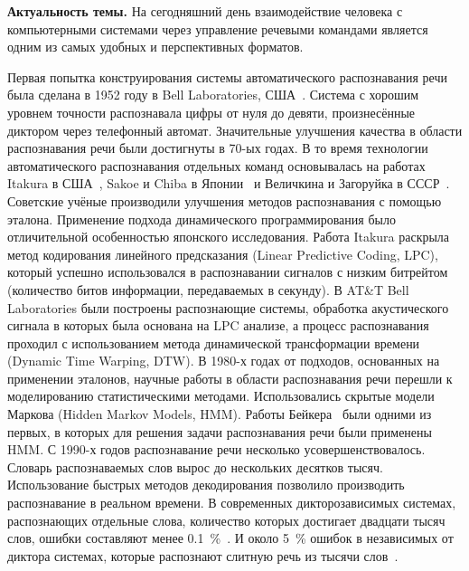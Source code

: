 \textbf{Актуальность темы.}
На сегодняшний день взаимодействие человека с компьютерными системами через управление речевыми командами является одним из самых удобных и перспективных форматов.


Первая попытка конструирования системы автоматического распознавания речи была сделана в 1952 году в Bell Laboratories, США~\cite{davis1952automatic}.
Система с хорошим уровнем точности распознавала цифры от нуля до девяти, произнесённые диктором через телефонный автомат.
Значительные улучшения качества в области распознавания речи были достигнуты в 70-ых годах.
В то время технологии автоматического распознавания отдельных команд основывалась на работах Itakura в США~\cite{itakura1975minimum}, Sakoe и Chiba в Японии~\cite{sakoe1978dynamic} и Величкина и Загоруйка в СССР~\cite{velichko1970automatic}.
Советские учёные производили улучшения методов распознавания с помощью эталона.
Применение подхода динамического программирования было отличительной особенностью японского исследования.
Работа Itakura раскрыла метод кодирования линейного предсказания (Linear Predictive Coding, LPC), который успешно использовался в распознавании сигналов с низким битрейтом (количество битов информации, передаваемых в секунду).
В AT\&T Bell Laboratories были построены распознающие системы, обработка акустического сигнала в которых была основана на LPC анализе, а процесс распознавания проходил с использованием метода динамической трансформации времени (Dynamic Time Warping, DTW).
В 1980-х годах от подходов, основанных на применении эталонов, научные работы в области распознавания речи перешли к моделированию статистическими методами.
Использовались скрытые модели Маркова (Hidden Markov Models, HMM).
Работы Бейкера~\cite{baker1990stochastic} были одними из первых, в которых для решения задачи распознавания речи были применены HMM.
С 1990-х годов распознавание речи несколько усовершенствовалось.
Словарь распознаваемых слов вырос до нескольких десятков тысяч.
Использование быстрых методов декодирования позволило производить распознавание в реальном времени.
В современных дикторозависимых системах, распознающих отдельные слова, количество которых достигает двадцати тысяч слов, ошибки составляют менее 0.1~\%~\cite{das1993influence}.
И около 5~\% ошибок в независимых от диктора системах, которые распознают слитную речь из тысячи слов~\cite{aubert1993continuous}.

